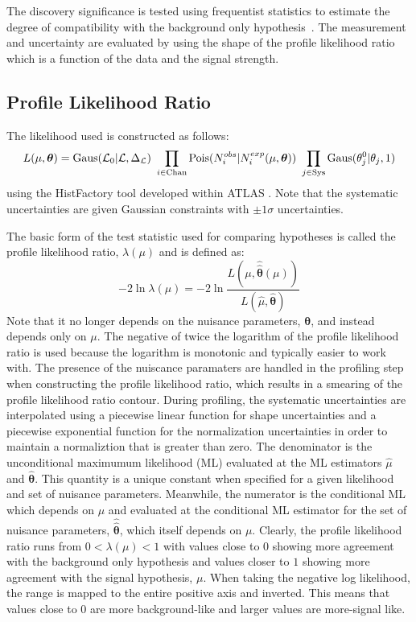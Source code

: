 The discovery significance is tested using frequentist statistics
to estimate the degree of compatibility with the background only 
hypothesis~\cite{Cowan:1277304}.
The measurement and uncertainty are evaluated 
by using the shape of the profile likelihood ratio~\cite{PDG:2014} 
which is a function of the data and the signal strength.

\subsection{Profile Likelihood Ratio}

The likelihood used is constructed as follows:
\begin{equation}
L(\mu,\boldsymbol{\theta}) = \mathrm{Gaus}(\mathcal{L}_0|\mathcal{L},\Delta_{\mathcal{L}})~\prod_{i\in\mathrm{Chan}} \mathrm{Pois}(N_i^{obs}|N_i^{exp}(\mu,\boldsymbol{\theta}))~\prod_{j\in\mathrm{Sys}} \mathrm{Gaus}(\theta_j^0|\theta_j,1)
\label{eq:poisson_likelihood}
\end{equation}
using the HistFactory tool developed within ATLAS \cite{Cranmer:1456844}. 
Note that the systematic uncertainties are given Gaussian 
constraints with $\pm1\sigma$ uncertainties.

The basic form of the 
test statistic used for comparing hypotheses is called the profile likelihood 
ratio, $\lambda(\mu)$ and is defined as:
\begin{equation}
-2 \ln \lambda(\mu) = -2 \ln \frac{L(\mu,\hat{\hat{\boldsymbol{\theta}}}(\mu))}{L(\hat{\mu},\hat{\boldsymbol{\theta}})}
\label{eq:profile_likelihood_ratio}
\end{equation}
Note that it no longer depends on the nuisance parameters, $\boldsymbol{\theta}$,
and instead depends only on $\mu$. 
The negative of twice the logarithm of the profile likelihood 
ratio is used because
the logarithm is monotonic and typically easier to work with.
The presence of the nuiscance paramaters are handled in the profiling 
step when constructing the profile likelihood ratio,  which results 
in a smearing of the profile likelihood ratio contour. 
During profiling, the systematic uncertainties are
interpolated using a piecewise linear function for shape uncertainties
and a piecewise exponential function for the normalization uncertainties
in order to maintain a normaliztion that is greater than zero.
The denominator is the 
unconditional maximumum likelihood (ML)
evaluated at the ML estimators $\hat{\mu}$ and $\hat{\boldsymbol{\theta}}$.
This quantity is a unique constant when specified for a given likelihood
and set of nuisance parameters.
Meanwhile, the numerator is the conditional ML which depends on $\mu$ and
evaluated at 
the conditional ML estimator for the set of nuisance parameters, 
$\hat{\hat{\boldsymbol{\theta}}}$, which itself depends on $\mu$.
Clearly, the profile likelihood ratio runs from $0 < \lambda(\mu) < 1$
with values close to $0$ showing more agreement with the background 
only hypothesis and values closer to $1$ showing more agreement with 
the signal hypothesis, $\mu$. 
When taking the negative log likelihood, the range
is mapped to the entire positive axis and inverted. This means
that values close to $0$ are more background-like and larger values 
are more-signal like.  

